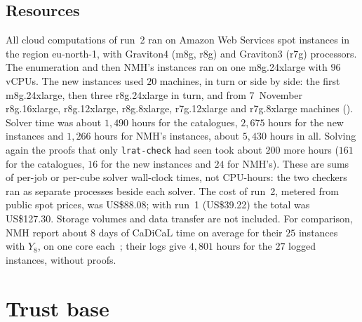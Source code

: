 \documentclass[11pt]{amsart}
\theoremstyle{definition}
\theoremstyle{remark}
\begin{document}
\subsection{Resources}\label{sec:resources}
All cloud computations of run~2 ran on Amazon Web Services spot instances in
the region eu-north-1, with Graviton4 (m8g, r8g) and Graviton3 (r7g)
processors. The enumeration and then NMH's instances ran on one m8g.24xlarge
with $96$ vCPUs. The new instances used $20$ machines, in turn or side by
side: the first m8g.24xlarge, then three r8g.24xlarge in turn, and from
7~November r8g.16xlarge, r8g.12xlarge, r8g.8xlarge, r7g.12xlarge and
r7g.8xlarge machines (). Solver time was about
$1{,}490$ hours for the catalogues, $2{,}675$ hours for the new instances and
$1{,}266$ hours for NMH's instances, about $5{,}430$ hours in all. Solving again
the proofs that only \texttt{lrat-check} had seen took about $200$ more hours
($161$ for the catalogues, $16$ for the new instances and $24$ for NMH's).
These are sums of per-job or per-cube solver wall-clock times, not CPU-hours:
the two checkers ran as separate processes beside each solver. The cost of
run~2, metered from public spot prices, was US\$88.08; with run~1
(US\$39.22) the total was US\$127.30. Storage volumes and data transfer are
not included.
For comparison, NMH report about $8$ days of CaDiCaL time on average for their
$25$ instances with $Y_8$, on one core each~\cite[\S5.2.3]{NMH22}; their logs give
$4{,}801$ hours for the $27$ logged instances, without proofs.

\section{Trust base}\label{sec:trust}
\end{document}
